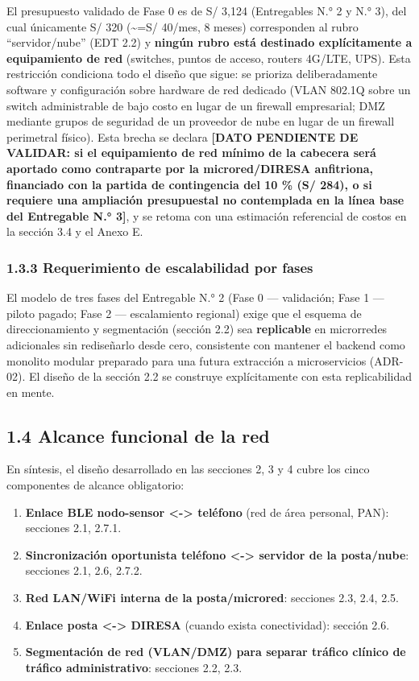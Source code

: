 \documentclass[11pt,a4paper]{article}
\providecommand{\tightlist}{%
  \setlength{\itemsep}{0pt}\setlength{\parskip}{0pt}}
\begin{document}
El presupuesto validado de Fase 0 es de S/ 3,124 (Entregables N.° 2 y N.° 3), del cual únicamente S/ 320 (\textasciitilde=S/ 40/mes, 8 meses) corresponden al rubro ``servidor/nube'' (EDT 2.2) y \textbf{ningún rubro está destinado explícitamente a equipamiento de red} (switches, puntos de acceso, routers 4G/LTE, UPS). Esta restricción condiciona todo el diseño que sigue: se prioriza deliberadamente software y configuración sobre hardware de red dedicado (VLAN 802.1Q sobre un switch administrable de bajo costo en lugar de un firewall empresarial; DMZ mediante grupos de seguridad de un proveedor de nube en lugar de un firewall perimetral físico). Esta brecha se declara \textbf{{[}DATO PENDIENTE DE VALIDAR: si el equipamiento de red mínimo de la cabecera será aportado como contraparte por la microred/DIRESA anfitriona, financiado con la partida de contingencia del 10 \% (S/ 284), o si requiere una ampliación presupuestal no contemplada en la línea base del Entregable N.° 3{]}}, y se retoma con una estimación referencial de costos en la sección 3.4 y el Anexo E.

\subsubsection{1.3.3 Requerimiento de escalabilidad por fases}\label{requerimiento-de-escalabilidad-por-fases}

El modelo de tres fases del Entregable N.° 2 (Fase 0 --- validación; Fase 1 --- piloto pagado; Fase 2 --- escalamiento regional) exige que el esquema de direccionamiento y segmentación (sección 2.2) sea \textbf{replicable} en microrredes adicionales sin rediseñarlo desde cero, consistente con mantener el backend como monolito modular preparado para una futura extracción a microservicios (ADR-02). El diseño de la sección 2.2 se construye explícitamente con esta replicabilidad en mente.

\subsection{1.4 Alcance funcional de la red}\label{alcance-funcional-de-la-red}

En síntesis, el diseño desarrollado en las secciones 2, 3 y 4 cubre los cinco componentes de alcance obligatorio:

\begin{enumerate}
\def\labelenumi{\arabic{enumi}.}
\tightlist
\item
  \textbf{Enlace BLE nodo-sensor \textless-\textgreater{} teléfono} (red de área personal, PAN): secciones 2.1, 2.7.1.
\item
  \textbf{Sincronización oportunista teléfono \textless-\textgreater{} servidor de la posta/nube}: secciones 2.1, 2.6, 2.7.2.
\item
  \textbf{Red LAN/WiFi interna de la posta/microred}: secciones 2.3, 2.4, 2.5.
\item
  \textbf{Enlace posta \textless-\textgreater{} DIRESA} (cuando exista conectividad): sección 2.6.
\item
  \textbf{Segmentación de red (VLAN/DMZ) para separar tráfico clínico de tráfico administrativo}: secciones 2.2, 2.3.
\end{enumerate}
\end{document}
